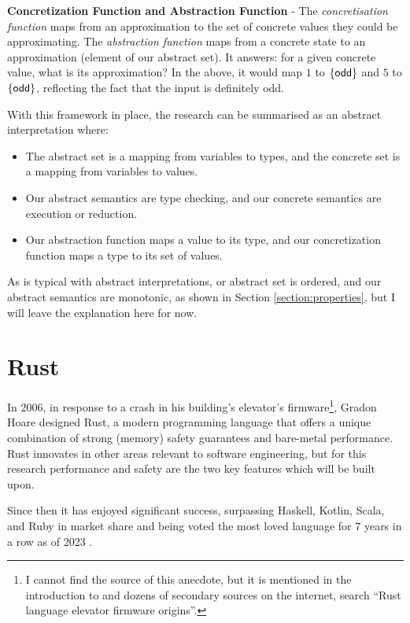 \documentclass[12pt,twoside]{report}
\begin{document}
\textbf{Concretization Function and Abstraction Function} - The \textit{concretisation function} maps from an approximation to the set of concrete values they could be approximating. The \textit{abstraction function} maps from a concrete state to an approximation (element of our abstract set). It answers: for a given concrete value, what is its approximation? In the above, it would map $1$ to $\{ \mathsf{odd} \}$ and $5$ to $\{ \mathsf{odd} \}$, reflecting the fact that the input is definitely odd.

With this framework in place, the research can be summarised as an abstract interpretation where:

\begin{itemize}
  \item The abstract set is a mapping from variables to types, and the concrete set is a mapping from variables to values.
  \item Our abstract semantics are type checking, and our concrete semantics are execution or reduction.
  \item Our abstraction function maps a value to its type, and our concretization function maps a type to its set of values.
\end{itemize}

As is typical with abstract interpretations, or abstract set is ordered, and our abstract semantics are monotonic, as shown in Section \ref{section:properties}, but I will leave the explanation here for now.

\section{Rust}
In 2006, in response to a crash in his building's elevator's firmware\footnote{I cannot find the source of this anecdote, but it is mentioned in the introduction to \cite{aeneas} and dozens of secondary sources on the internet, search ``Rust language elevator firmware origins''.}, Gradon Hoare designed Rust, a modern programming language that offers a unique combination of strong (memory) safety guarantees and bare-metal performance. Rust innovates in other areas relevant to software engineering, but for this research performance and safety are the two key features which will be built upon.

Since then it has enjoyed significant success, surpassing Haskell, Kotlin, Scala, and Ruby in market share \citep{TIOBEIndex} and being voted the most loved language for 7 years in a row as of 2023 \cite{StackOverflowDeveloper}.
\end{document}
